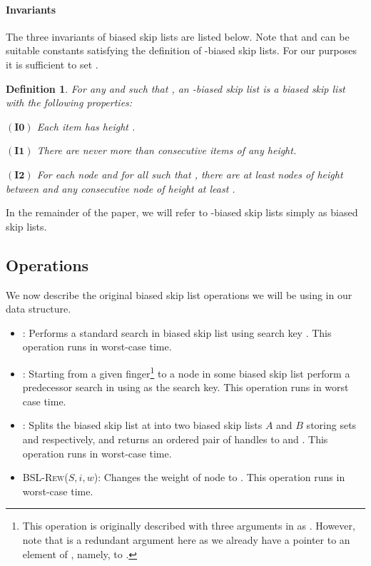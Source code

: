 \documentclass[11pt]{article}
\newcommand{\Bslrewx}[3]{\mbox{\textsc{BSL-Rew(\ensuremath{#1,#2,#3})}}}
\newcommand{\invzero}{\ensuremath{\mathbf{(I0)}}}
\newcommand{\invone}{\ensuremath{\mathbf{(I1)}}}
\newcommand{\invtwo}{\ensuremath{\mathbf{(I2)}}}
\newcommand{\bsl}[1]{\ensuremath{#1}}
\newcounter{count}
\newtheorem{defn}[count]{Definition}
\begin{document}
\paragraph{Invariants} 
The three invariants of biased skip lists are listed below. Note that  and  can be suitable constants satisfying the definition of -biased skip lists. For our purposes it is sufficient to set . 
\begin{defn} 
For any  and  such that , an -biased skip list is a biased skip list with the following properties: 
\begin{description} 
\item {\invzero} Each item  has height . 
\item {\invone} There are never more than  consecutive items of any height. 
\item {\invtwo} For each node  and for all  such that , there are at least  nodes of height  between  and any consecutive node of height at least . 
\end{description} 
\end{defn} 
\noindent In the remainder of the paper, we will refer to -biased skip lists simply as biased skip lists. 
\subsection{Operations} 
\label{subsec:BSLOps} 

We now describe the original biased skip list operations we will be using in our data structure. 

\begin{itemize} 

 \item : Performs a standard search in biased skip list  using search key . This operation runs in worst-case  time. 
 \item : Starting from a given finger\footnote{This operation is originally described with three arguments in \cite{journals/algorithmica/BagchiBG05} as . However, note that  is a redundant argument here as we already have a pointer to an element of , namely, to .} to a node  in some biased skip list  perform a predecessor search in   using  as the search key. This operation runs in 
 worst case time. 
 \item : Splits the biased skip list  at  into two biased skip lists \bsl A and \bsl B storing sets  and  respectively, and returns an ordered pair of handles to  and . This operation runs in worst-case  time. 

\item \Bslrewx{S}{i}{w}: Changes the weight of node  to . This operation runs in worst-case  time. 


\end{itemize} 
\end{document}
